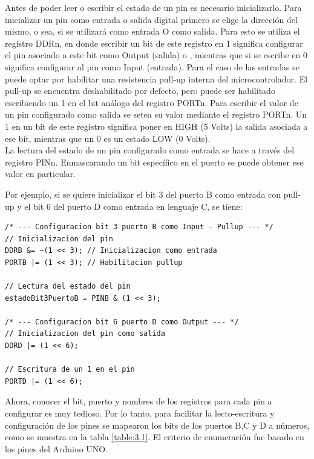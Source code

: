 Antes de poder leer o escribir el estado de un pin es necesario inicializarlo. Para inicializar un pin como entrada o salida digital primero se elige la dirección del mismo, o sea, si se utilizará como entrada O como salida. Para esto se utiliza el registro DDRn, en donde escribir un bit de este registro en 1 significa configurar el pin asociado a este bit como Output (salida) o , mientras que si se escribe en 0 significa configurar al pin como Input (entrada). Para el caso de las entradas se puede optar por habilitar una resistencia pull-up interna del microcontrolador. El pull-up se encuentra deshabilitado por defecto, pero puede ser habilitado escribiendo un 1 en el bit análogo del registro PORTn.
Para escribir el valor de un pin configurado como salida se setea su valor mediante el registro PORTn. Un 1 en un bit de este registro significa poner en HIGH (5 Volts) la salida asociada a ese bit, mientras que un 0 es un estado LOW (0 Volts).\\
La lectura del estado de un pin configurado como entrada se hace a través del registro PINn. Enmascarando un bit específico en el puerto se puede obtener ese valor en particular.

Por ejemplo, si se quiere inicializar el bit 3 del puerto B como entrada con pull-up y el bit 6 del puerto D como entrada en lenguaje C, se tiene:

\begin{lstlisting}[style=CStyle]
/* --- Configuracion bit 3 puerto B como Input - Pullup --- */
// Inicializacion del pin
DDRB &= ~(1 << 3); // Inicializacion como entrada
PORTB |= (1 << 3); // Habilitacion pullup

// Lectura del estado del pin
estadoBit3PuertoB = PINB & (1 << 3);

/* --- Configuracion bit 6 puerto D como Output --- */
// Inicializacion del pin como salida
DDRD |= (1 << 6); 

// Escritura de un 1 en el pin
PORTD |= (1 << 6); 
\end{lstlisting}

Ahora, conocer el bit, puerto y nombres de los registros para cada pin a configurar es muy tedioso. Por lo tanto, para facilitar la lecto-escritura y configuración de los pines se mapearon los bits de los puertos B,C y D a números, como se muestra en la tabla \ref{table:3.1}. El criterio de enumeración fue basado en los pines del Arduino UNO.

